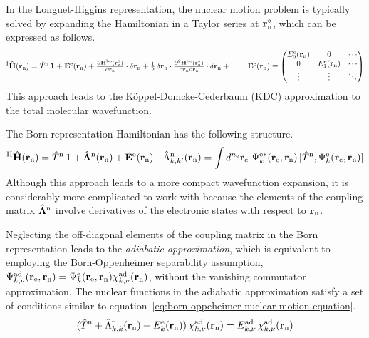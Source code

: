 \documentclass[11pt]{article}
\begin{document}
\begin{rmk}
In the Longuet-Higgins representation, the nuclear motion problem is typically solved by expanding the Hamiltonian in a Taylor series at $\mathbf{r}_{\mathrm{n}}^\circ$, which can be expressed as follows.
\begin{align}
  {}^\mr{I}\op{\bo{H}}(\bo{r}_\mr{n})
=
  \op{T}^\mr{n}\,
  \bo{1}
+
  \bo{E}^\mr{e}(\bo{r}_\mr{n})
+
  \tpd{
    \bo{H}^\mr{bo}(\bo{r}_\mr{n}^\circ)
  }{
    \bo{r}_\mr{n}
  }
  \cdot
  \d\bo{r}_\mr{n}
+
  \tfr{1}{2}\,
  \d\bo{r}_\mr{n}
  \cdot
  \tpd{
    ^2\bo{H}^\mr{bo}(\bo{r}_\mr{n}^\circ)
  }{
    \bo{r}_\mr{n}
    \pt
    \bo{r}_\mr{n}
  }
  \cdot
  \d\bo{r}_\mr{n}
+
  \ld
&&
  \bo{E}^\mr{e}(\bo{r}_\mr{n})
\equiv
  \ma{
    E_0^\mr{e}(\bo{r}_\mr{n}) & 0 & \cd \\
    0 & E_1^\mr{e}(\bo{r}_\mr{n}) & \cd \\
    \vd & \vd & \dd \\
  }
\end{align}
This approach leads to the K\"oppel-Domcke-Cederbaum (KDC) approximation to the total molecular wavefunction.
\end{rmk}

\begin{rmk}
The Born-representation Hamiltonian has the following structure.
\begin{align}
  {}^\mr{II}\op{\bo{H}}(\bo{r}_\mr{n})
=
  \op{T}^\mr{n}\,
  \bo{1}
+
  \op{\bm{\La}}^\mr{n}(\bo{r}_\mr{n})
+
  \bo{E}^\mr{e}(\bo{r}_\mr{n})
&&
  \op{\La}_{k,k'}^\mr{n}(\bo{r}_\mr{n})
=
  \int
  d^{n_\mr{e}}\bo{r}_\mr{e}\,\,
  \Y_k^{\mr{e}*}(\bo{r}_\mr{e},\bo{r}_\mr{n})\,
  [
    \op{T}^\mr{n}
  ,
    \Y_k^\mr{e}(\bo{r}_\mr{e},\bo{r}_\mr{n})
  ]
\end{align}
Although this approach leads to a more compact wavefunction expansion, it is considerably more complicated to work with because the elements of the coupling matrix $\op{\bm{\La}}^\mr{n}$ involve derivatives of the electronic states with respect to $\mathbf{r}_{\mathrm{n}}$.
\end{rmk}

\begin{dfn}
Neglecting the off-diagonal elements of the coupling matrix in the Born representation leads to the \textit{adiabatic approximation}, which is equivalent to employing the Born-Oppenheimer separability assumption,
$
  \Y_{k,\nu}^\mr{ad}(\bo{r}_\mr{e},\bo{r}_\mr{n})
=
  \Y_k^\mr{e}(\bo{r}_\mr{e},\bo{r}_\mr{n})
  \x_{k,\nu}^\mr{ad}(\bo{r}_\mr{n})
$,
without the vanishing commutator approximation.
The nuclear functions in the adiabatic approximation satisfy a set of conditions similar to equation~\ref{eq:born-oppeheimer-nuclear-motion-equation}.
\begin{align}
  (
    \op{T}^\mr{n}
  +
    \op{\La}_{k,k}^\mr{n}(\bo{r}_\mr{n})
  +
    E_k^\mr{e}(\bo{r}_\mr{n})
  )\,
  \x_{k,\nu}^\mr{ad}(\bo{r}_\mr{n})
=
  E_{k,\nu}^\mr{ad}\,
  \x_{k,\nu}^\mr{ad}(\bo{r}_\mr{n})
\end{align}
\end{dfn}
\end{document}
